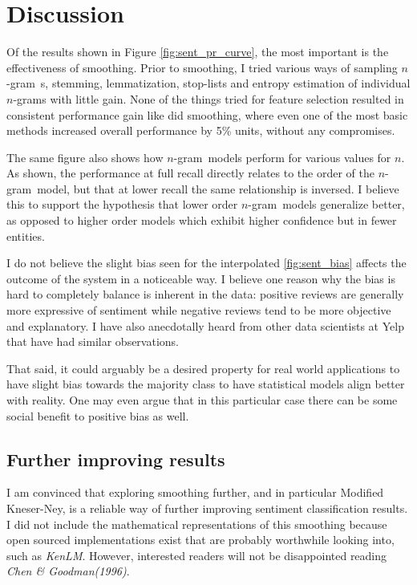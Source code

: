 \documentclass[a4paper,11pt]{kth-mag}
\newcommand{\ngram}{$n$-gram}
\newcommand{\ysc}{Modified Kneser-Ney classifier}
\begin{document}
\newpage
\section{Discussion}
Of the results shown in Figure \ref{fig:sent_pr_curve}, the most important 
is the effectiveness of smoothing.
Prior to smoothing, I tried various ways of sampling \ngram~s, stemming, lemmatization, stop-lists and entropy estimation of individual \ngram s with little gain. None of the things tried for feature selection resulted in consistent performance gain like did smoothing, where even one of the most basic methods increased overall performance by 5\% units, without any compromises.

The same figure also shows how \ngram~models perform for various values for $n$.
As shown, the performance at full recall directly relates to the order of the
\ngram~model, but that at lower recall the same relationship is inversed. I believe this
to support the hypothesis that lower order \ngram~models generalize better, as opposed to higher order
models which exhibit higher confidence but in fewer entities.



I do not believe the slight bias seen for the interpolated \ref{fig:sent_bias} affects the outcome of the
system in a noticeable way. I believe one reason why the bias is hard to completely balance is inherent in the data:
positive reviews are generally more expressive of sentiment while negative reviews tend to be more objective and
explanatory. I have also anecdotally heard from other data scientists at Yelp that have had similar observations.

That said, it could arguably be a desired property for real world applications to have slight bias towards the majority class
to have statistical models align better with reality. One may even argue that in this particular case there can be some social benefit to positive bias as well.


\subsection{Further improving results}
I am convinced that exploring smoothing further, and in particular Modified Kneser-Ney,
is a reliable way of further improving sentiment classification results. I did not include the
mathematical representations of this smoothing because open sourced implementations exist
that are probably worthwhile looking into, such as \emph{KenLM}\cite{kenlm}. However, interested readers will not
be disappointed reading \emph{Chen \& Goodman(1996)}\cite{chen_goodman}.
\end{document}

